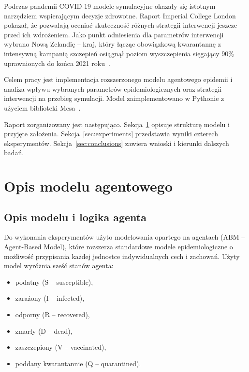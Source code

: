 \documentclass[polish]{projectreport}
\begin{document}
Podczas pandemii COVID-19 modele symulacyjne okazały się istotnym
narzędziem wspierającym decyzje zdrowotne. Raport Imperial College
London~\cite{ferguson2020report} pokazał, że pozwalają oceniać
skuteczność różnych strategii interwencji jeszcze przed ich
wdrożeniem. Jako punkt odniesienia dla parametrów interwencji
wybrano Nową Zelandię -- kraj, który łącząc obowiązkową kwarantannę
z intensywną kampanią szczepień osiągnął poziom wyszczepienia
sięgający 90\% uprawnionych do końca 2021 roku~\cite{baker2022newzealand}.

Celem pracy jest implementacja rozszerzonego modelu agentowego
epidemii i analiza wpływu wybranych parametrów epidemiologicznych
oraz strategii interwencji na przebieg symulacji. Model
zaimplementowano w Pythonie z użyciem biblioteki
Mesa~\cite{kazil2020mesa}.

Raport zorganizowany jest następująco. Sekcja~\ref{sec:solution}
opisuje strukturę modelu i przyjęte założenia.
Sekcja~\ref{sec:experiments} przedstawia wyniki czterech
eksperymentów. Sekcja~\ref{sec:conclusions} zawiera wnioski
i kierunki dalszych badań.

\section{Opis modelu agentowego}
\label{sec:solution}

\subsection{Opis modelu i logika agenta}
\label{sec:model}

Do wykonania eksperymentów użyto modelowania opartego na agentach
(ABM -- Agent-Based Model), które rozszerza standardowe modele
epidemiologiczne o możliwość przypisania każdej jednostce
indywidualnych cech i zachowań. Użyty model wyróżnia sześć stanów
agenta:

\begin{itemize}
    \item podatny (S -- susceptible),
    \item zarażony (I -- infected),
    \item odporny (R -- recovered),
    \item zmarły (D -- dead),
    \item zaszczepiony (V -- vaccinated),
    \item poddany kwarantannie (Q -- quarantined).
\end{itemize}
\end{document}
